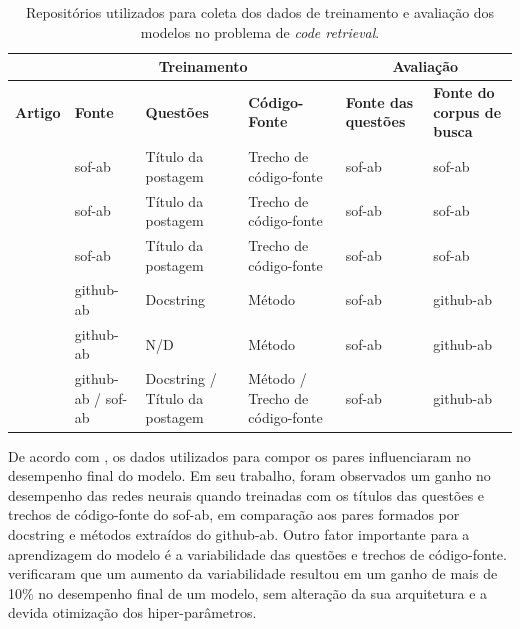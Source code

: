 \begin{table}[h]
\centering
\begin{tabular}{ p{8em} p{5em} p{5em} p{5em} p{5em} p{5em} }
\hline
 & \multicolumn{3}{c}{\textbf{Treinamento}} & \multicolumn{2}{c}{\textbf{Avaliação}} \\
\hline
\textbf{Artigo} & \textbf{Fonte} & \textbf{Questões} & \textbf{Código-Fonte} & \textbf{Fonte das questões} & \textbf{Fonte do corpus de busca}\\
\hline

\cite{Allamanis-bimodal-source-code-natural-language:2015} & \acrshort{sof-ab} & Título da postagem & Trecho de código-fonte & \acrshort{sof-ab} & \acrshort{sof-ab}\\

\cite{Chen-bi-variational-autoencoder:2018} & \acrshort{sof-ab} & Título da postagem & Trecho de código-fonte & \acrshort{sof-ab} & \acrshort{sof-ab}\\

\cite{iyer-etal-2016-summarizing} & \acrshort{sof-ab} & Título da postagem & Trecho de código-fonte & \acrshort{sof-ab} & \acrshort{sof-ab}\\

\cite{Gu-deep-code-search:2018} & \acrshort{github-ab} & Docstring & Método & \acrshort{sof-ab} & \acrshort{github-ab}\\

\cite{Sachdev-neural-code-search:2018} & \acrshort{github-ab} & N/D & Método	& \acrshort{sof-ab} & \acrshort{github-ab}\\

\cite{cambronero-deep-learning-code-search:2019} & \acrshort{github-ab} / \acrshort{sof-ab} & Docstring / Título da postagem & Método / Trecho de código-fonte & \acrshort{sof-ab} & \acrshort{github-ab}\\

 \hline
 
\end{tabular}
\caption{Repositórios utilizados para coleta dos dados de treinamento e avaliação dos modelos no problema de \textit{code retrieval}.}
\label{table:summary-source-data}
\end{table}




De acordo com \cite{cambronero-deep-learning-code-search:2019}, os dados utilizados para compor os pares influenciaram no desempenho final do modelo. Em seu trabalho, foram observados um ganho no desempenho das redes neurais quando treinadas com os títulos das questões e trechos de código-fonte do \acrlong{sof-ab}, em comparação aos pares formados por \gls{docstring} e métodos extraídos do \acrlong{github-ab}. Outro fator importante para a aprendizagem do modelo é a variabilidade das questões e trechos de código-fonte. \cite{yao-2018} verificaram que um aumento da variabilidade resultou em um ganho de mais de 10\% no desempenho final de um modelo, sem alteração da sua arquitetura e a devida otimização dos hiper-parâmetros.



